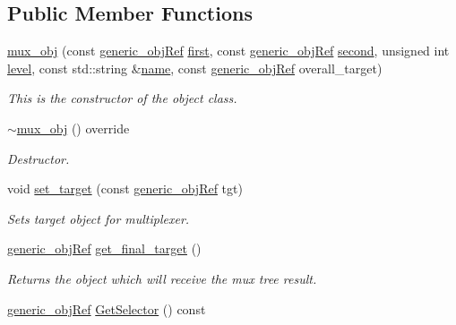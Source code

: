 \subsection*{Public Member Functions}
\begin{DoxyCompactItemize}
\item 
\hyperlink{classmux__obj_a4293bb84de54083300493e69e5d4b04a}{mux\+\_\+obj} (const \hyperlink{generic__obj_8hpp_acb533b2ef8e0fe72e09a04d20904ca81}{generic\+\_\+obj\+Ref} \hyperlink{classmux__obj_aa9c5fc6891933d32ba3391f1ab7b191c}{first}, const \hyperlink{generic__obj_8hpp_acb533b2ef8e0fe72e09a04d20904ca81}{generic\+\_\+obj\+Ref} \hyperlink{classmux__obj_ad74f976cc4b0e190b6b33b1f98f87b89}{second}, unsigned int \hyperlink{classmux__obj_a1134826e354b1af20b7ea8f260772965}{level}, const std\+::string \&\hyperlink{classgeneric__obj_afb35a4055929764e503d9d6b4689c039}{name}, const \hyperlink{generic__obj_8hpp_acb533b2ef8e0fe72e09a04d20904ca81}{generic\+\_\+obj\+Ref} overall\+\_\+target)
\begin{DoxyCompactList}\small\item\em This is the constructor of the object class. \end{DoxyCompactList}\item 
\hyperlink{classmux__obj_ab90330142a4aa1987568be56f12ede91}{$\sim$mux\+\_\+obj} () override
\begin{DoxyCompactList}\small\item\em Destructor. \end{DoxyCompactList}\item 
void \hyperlink{classmux__obj_a2307b43d9f2f26a12dac868d4bf4fc1a}{set\+\_\+target} (const \hyperlink{generic__obj_8hpp_acb533b2ef8e0fe72e09a04d20904ca81}{generic\+\_\+obj\+Ref} tgt)
\begin{DoxyCompactList}\small\item\em Sets target object for multiplexer. \end{DoxyCompactList}\item 
\hyperlink{generic__obj_8hpp_acb533b2ef8e0fe72e09a04d20904ca81}{generic\+\_\+obj\+Ref} \hyperlink{classmux__obj_a42aaff6789a4c06f4c7158dad6215a4e}{get\+\_\+final\+\_\+target} ()
\begin{DoxyCompactList}\small\item\em Returns the object which will receive the mux tree result. \end{DoxyCompactList}\item 
\hyperlink{generic__obj_8hpp_acb533b2ef8e0fe72e09a04d20904ca81}{generic\+\_\+obj\+Ref} \hyperlink{classmux__obj_a317c877ec50b264b68d9adf3cecf2d84}{Get\+Selector} () const

\end{DoxyCompactItemize}
